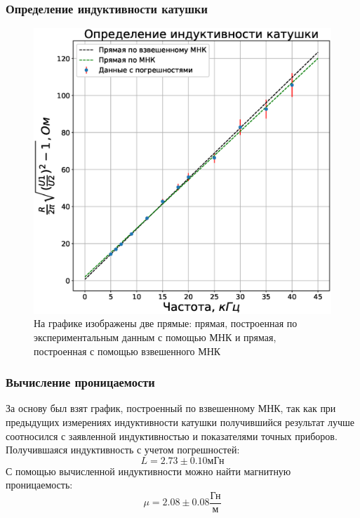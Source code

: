 \documentclass[8pt,pdf,hyperref={unicode}]{beamer}
\begin{document}
	\begin{frame}
		\frametitle{Определение индуктивности катушки} 
		\begin{center}
			\begin{figure}[h!]
				\centering
				\includegraphics[width=.5\linewidth]{Lab2_1.eps}
				\caption{На графике изображены две прямые: прямая, построенная по экспериментальным данным с помощью МНК и прямая, построенная с помощью взвешенного МНК}
				\label{fig:3}
			\end{figure}
		\end{center}
	\end{frame}

	\begin{frame}
		\frametitle{Вычисление проницаемости} 
		\begin{center}
			За основу был взят график, построенный по взвешенному МНК, так как при предыдущих измерениях индуктивности катушки получившийся результат лучше соотносился с заявленной индуктивностью и показателями точных приборов.
			\newline
			Получившаяся индуктивность с учетом погрешностей:
			\begin{equation}	
			L = 2.73 \pm 0.10\text{мГн}
			\end{equation}
			С помощью вычисленной индуктивности можно найти магнитную проницаемость:
			\begin{equation}
			\mu = 2.08 \pm 0.08\frac{\text{Гн}}{\text{м}}
			\end{equation}
		\end{center}
	\end{frame}
\end{document}
